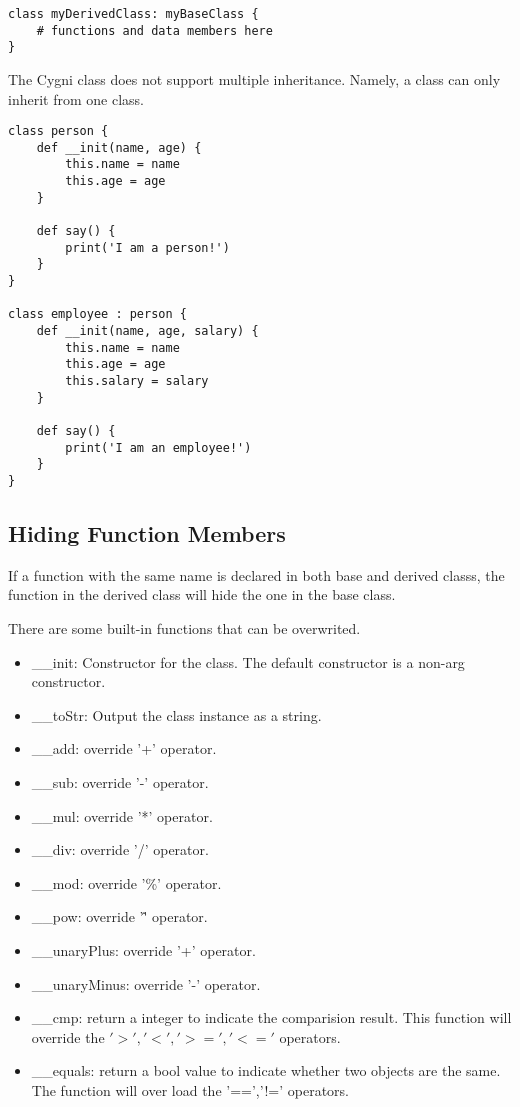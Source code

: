 \begin{lstlisting}
class myDerivedClass: myBaseClass {
	# functions and data members here
}
\end{lstlisting} 

The Cygni class does not support multiple inheritance. Namely, a class can only inherit from one class.

\begin{lstlisting}
class person {
	def __init(name, age) {
		this.name = name
		this.age = age
	}

	def say() {
		print('I am a person!')
	}
}

class employee : person {
	def __init(name, age, salary) {
		this.name = name
		this.age = age
		this.salary = salary
	}

	def say() {
		print('I am an employee!')
	}
}
\end{lstlisting}


\subsection{Hiding Function Members}
If a function with the same name is declared in both base and derived classs, the function in the derived class will hide the one in the base class.

There are some built-in functions that can be overwrited.
\begin{itemize}
	\item \_\_init: Constructor for the class. The default constructor is a non-arg constructor.
	\item \_\_toStr: Output the class instance as a string.
	\item \_\_add: override '+' operator.
	\item \_\_sub: override '-' operator.
	\item \_\_mul: override '*' operator.
	\item \_\_div: override '/' operator.
	\item \_\_mod: override '\%' operator.
	\item \_\_pow: override '\^' operator.
	\item \_\_unaryPlus: override '+' operator.
	\item \_\_unaryMinus: override '-' operator.
	\item \_\_cmp: return a integer to indicate the comparision result. This function will override the $'>', '<', '>=', '<='$ operators.
	\item \_\_equals: return a bool value to indicate whether two objects are the same. The function will over load the '==','!=' operators.
\end{itemize}
